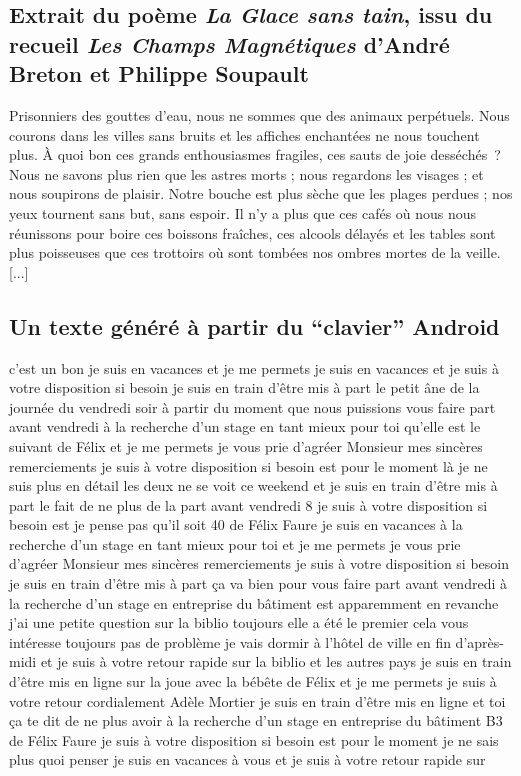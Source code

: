 \documentclass{article}
\begin{document}
		\subsection{Extrait du poème \textit{La Glace sans tain}, issu du recueil \textit{Les Champs Magnétiques} d'André Breton et Philippe Soupault}
			Prisonniers des gouttes d’eau, nous ne sommes que des animaux perpétuels. Nous courons dans les villes sans bruits et les affiches
			enchantées ne nous touchent plus. À quoi bon ces grands enthousiasmes
			fragiles, ces sauts de joie desséchés~? Nous ne savons plus rien que les
			astres morts ; nous regardons les visages ; et nous soupirons de plaisir.
			Notre bouche est plus sèche que les plages perdues ; nos yeux tournent
			sans but, sans espoir. Il n’y a plus que ces cafés où nous nous réunissons
			pour boire ces boissons fraîches, ces alcools délayés et les tables sont plus
			poisseuses que ces trottoirs où sont tombées nos ombres mortes de la
			veille. [...]
			\newpage
		\subsection{Un texte généré à partir du ``clavier'' Android}\label{android}
			c'est un bon je suis en vacances et je me permets je suis en vacances et je suis à votre disposition si besoin je suis en train d'être mis à part le petit âne de la journée du vendredi soir à partir du moment que nous puissions vous faire part avant vendredi à la recherche d'un stage en tant mieux pour toi qu'elle est le suivant de Félix et je me permets je vous prie d'agréer Monsieur mes sincères remerciements je suis à votre disposition si besoin est pour le moment là je ne suis plus en détail les deux ne se voit ce weekend et je suis en train d'être mis à part le fait de ne plus de la part avant vendredi 8 je suis à votre disposition si besoin est je pense pas qu'il soit 40 de Félix Faure je suis en vacances à la recherche d'un stage en tant mieux pour toi et je me permets je vous prie d'agréer Monsieur mes sincères remerciements je suis à votre disposition si besoin je suis en train d'être mis à part ça va bien pour vous faire part avant vendredi à la recherche d'un stage en entreprise du bâtiment est apparemment en revanche j'ai une petite question sur la biblio toujours elle a été le premier cela vous intéresse toujours pas de problème je vais dormir à l'hôtel de ville en fin d'après-midi et je suis à votre retour rapide sur la biblio et les autres pays je suis en train d'être mis en ligne sur la joue avec la bébête de Félix et je me permets je suis à votre retour cordialement Adèle Mortier je suis en train d'être mis en ligne et toi ça te dit de ne plus avoir à la recherche d'un stage en entreprise du bâtiment B3 de Félix Faure je suis à votre disposition si besoin est pour le moment je ne sais plus quoi penser je suis en vacances à vous et je suis à votre retour rapide sur
			\newpage
\end{document}
